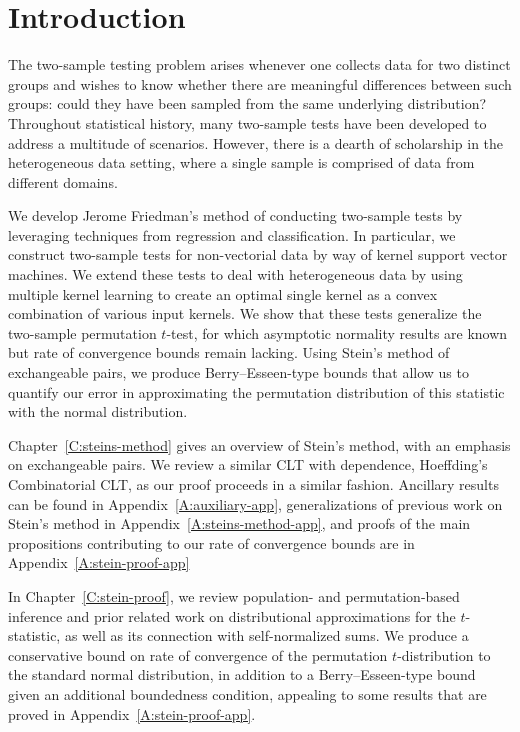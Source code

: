 \chapter{Introduction}

The two-sample testing problem arises whenever one collects data for
two distinct groups and wishes to know whether there are meaningful
differences between such groups: could they have been sampled from the
same underlying distribution?  Throughout statistical history, many
two-sample tests have been developed to address a multitude of
scenarios.  However, there is a dearth of scholarship in the
heterogeneous data setting, where a single sample is comprised of data
from different domains.

We develop Jerome Friedman's method of conducting two-sample tests
by leveraging techniques from regression and classification.  In
particular, we construct two-sample tests for non-vectorial data by
way of kernel support vector machines.  We extend these tests to deal
with heterogeneous data by using multiple kernel learning to create
an optimal single kernel as a convex combination of various input
kernels.  We show that these tests generalize the two-sample permutation
$t$-test, for which asymptotic normality results are known but rate of
convergence bounds remain lacking.  Using Stein's method of
exchangeable pairs, we produce Berry--Esseen-type bounds that allow us
to quantify our error in approximating the permutation distribution
of this statistic with the normal distribution.

Chapter~\ref{C:steins-method} gives an overview of Stein's method,
with an emphasis on exchangeable pairs.  We review a similar CLT with
dependence, Hoeffding's Combinatorial CLT, as our proof proceeds in a
similar fashion.  Ancillary results can be found in
Appendix~\ref{A:auxiliary-app}, generalizations of previous work on
Stein's method in Appendix~\ref{A:steins-method-app}, and proofs of
the main propositions contributing to our rate of convergence bounds
are in Appendix~\ref{A:stein-proof-app}

In Chapter~\ref{C:stein-proof}, we review population- and
permutation-based inference and prior related work on distributional
approximations for the $t$-statistic, as well as its connection with
self-normalized sums.  We produce a conservative bound on rate of
convergence of the permutation $t$-distribution to the standard normal
distribution, in addition to a Berry--Esseen-type bound given an
additional boundedness condition, appealing to some results that are
proved in Appendix~\ref{A:stein-proof-app}.

